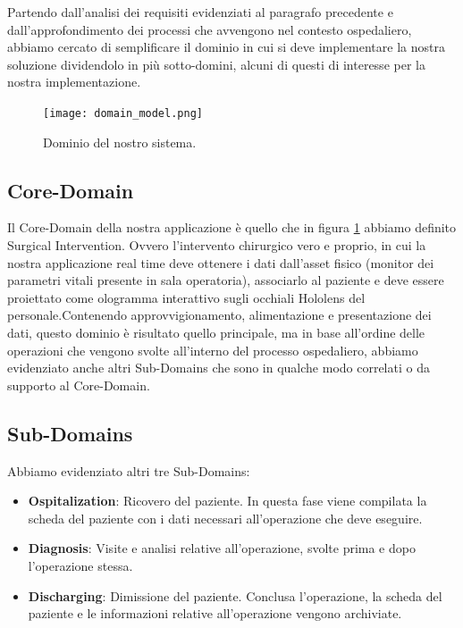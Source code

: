 Partendo dall'analisi dei requisiti evidenziati al paragrafo precedente e dall'approfondimento dei processi che avvengono nel contesto ospedaliero, abbiamo cercato di semplificare il dominio in cui si deve implementare la nostra soluzione dividendolo in più sotto-domini, alcuni di questi di interesse per la nostra implementazione.

\begin{figure}[H]
    \texttt{[image: domain\_model.png]}
    \centering
    \caption{\label{pic:domain-model}Dominio del nostro sistema.}
\end{figure}

\subsection{Core-Domain}
Il Core-Domain della nostra applicazione è quello che in figura \ref{pic:domain-model} abbiamo definito Surgical Intervention. Ovvero l'intervento chirurgico vero e proprio, in cui la nostra applicazione real time deve ottenere i dati dall'asset fisico (monitor dei parametri vitali presente in sala operatoria), associarlo al paziente e deve essere proiettato come ologramma interattivo sugli occhiali Hololens del personale.\newline \newline Contenendo approvvigionamento, alimentazione e presentazione dei dati, questo dominio è risultato quello principale, ma in base all'ordine delle operazioni che vengono svolte all'interno del processo ospedaliero, abbiamo evidenziato anche altri Sub-Domains che sono in qualche modo correlati o da supporto al Core-Domain.

\subsection{Sub-Domains}
Abbiamo evidenziato altri tre Sub-Domains:
\begin{itemize}
    \item \textbf{Ospitalization}: Ricovero del paziente. In questa fase viene compilata la scheda del paziente con i dati necessari all'operazione che deve eseguire.
    
    \item \textbf{Diagnosis}: Visite e analisi relative all'operazione, svolte prima e dopo l'operazione stessa.
    
    \item \textbf{Discharging}: Dimissione del paziente. Conclusa l'operazione, la scheda del paziente e le informazioni relative all'operazione vengono archiviate.
\end{itemize}


